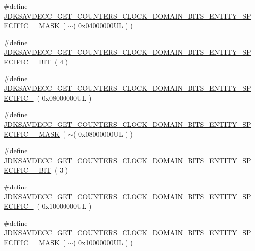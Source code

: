 \begin{DoxyCompactItemize}
\item 
\#define \hyperlink{group__get__counters__clock__domain__bits_gafa296abf8e30f09d23590a6b93f32a8c}{J\+D\+K\+S\+A\+V\+D\+E\+C\+C\+\_\+\+G\+E\+T\+\_\+\+C\+O\+U\+N\+T\+E\+R\+S\+\_\+\+C\+L\+O\+C\+K\+\_\+\+D\+O\+M\+A\+I\+N\+\_\+\+B\+I\+T\+S\+\_\+\+E\+N\+T\+I\+T\+Y\+\_\+\+S\+P\+E\+C\+I\+F\+I\+C\+\_\+\_\+\+M\+A\+SK}~( $\sim$( 0x04000000\+U\+L ) )
\item 
\#define \hyperlink{group__get__counters__clock__domain__bits_ga35faf687df9f185c32b0334ebe42051d}{J\+D\+K\+S\+A\+V\+D\+E\+C\+C\+\_\+\+G\+E\+T\+\_\+\+C\+O\+U\+N\+T\+E\+R\+S\+\_\+\+C\+L\+O\+C\+K\+\_\+\+D\+O\+M\+A\+I\+N\+\_\+\+B\+I\+T\+S\+\_\+\+E\+N\+T\+I\+T\+Y\+\_\+\+S\+P\+E\+C\+I\+F\+I\+C\+\_\+\_\+\+B\+IT}~( 4 )
\item 
\#define \hyperlink{group__get__counters__clock__domain__bits_ga399bf7154006fcc1fde390a46274982b}{J\+D\+K\+S\+A\+V\+D\+E\+C\+C\+\_\+\+G\+E\+T\+\_\+\+C\+O\+U\+N\+T\+E\+R\+S\+\_\+\+C\+L\+O\+C\+K\+\_\+\+D\+O\+M\+A\+I\+N\+\_\+\+B\+I\+T\+S\+\_\+\+E\+N\+T\+I\+T\+Y\+\_\+\+S\+P\+E\+C\+I\+F\+I\+C\+\_}~( 0x08000000\+U\+L )
\item 
\#define \hyperlink{group__get__counters__clock__domain__bits_gaac84ed5a88138bfb85681dbcb292d7f9}{J\+D\+K\+S\+A\+V\+D\+E\+C\+C\+\_\+\+G\+E\+T\+\_\+\+C\+O\+U\+N\+T\+E\+R\+S\+\_\+\+C\+L\+O\+C\+K\+\_\+\+D\+O\+M\+A\+I\+N\+\_\+\+B\+I\+T\+S\+\_\+\+E\+N\+T\+I\+T\+Y\+\_\+\+S\+P\+E\+C\+I\+F\+I\+C\+\_\+\_\+\+M\+A\+SK}~( $\sim$( 0x08000000\+U\+L ) )
\item 
\#define \hyperlink{group__get__counters__clock__domain__bits_gab42f5a56bfa9c065e3abacb10777a738}{J\+D\+K\+S\+A\+V\+D\+E\+C\+C\+\_\+\+G\+E\+T\+\_\+\+C\+O\+U\+N\+T\+E\+R\+S\+\_\+\+C\+L\+O\+C\+K\+\_\+\+D\+O\+M\+A\+I\+N\+\_\+\+B\+I\+T\+S\+\_\+\+E\+N\+T\+I\+T\+Y\+\_\+\+S\+P\+E\+C\+I\+F\+I\+C\+\_\+\_\+\+B\+IT}~( 3 )
\item 
\#define \hyperlink{group__get__counters__clock__domain__bits_ga751b07154321113ab903ecb807725ead}{J\+D\+K\+S\+A\+V\+D\+E\+C\+C\+\_\+\+G\+E\+T\+\_\+\+C\+O\+U\+N\+T\+E\+R\+S\+\_\+\+C\+L\+O\+C\+K\+\_\+\+D\+O\+M\+A\+I\+N\+\_\+\+B\+I\+T\+S\+\_\+\+E\+N\+T\+I\+T\+Y\+\_\+\+S\+P\+E\+C\+I\+F\+I\+C\+\_}~( 0x10000000\+U\+L )
\item 
\#define \hyperlink{group__get__counters__clock__domain__bits_ga6fc15f282e185e438b17b738b80fa880}{J\+D\+K\+S\+A\+V\+D\+E\+C\+C\+\_\+\+G\+E\+T\+\_\+\+C\+O\+U\+N\+T\+E\+R\+S\+\_\+\+C\+L\+O\+C\+K\+\_\+\+D\+O\+M\+A\+I\+N\+\_\+\+B\+I\+T\+S\+\_\+\+E\+N\+T\+I\+T\+Y\+\_\+\+S\+P\+E\+C\+I\+F\+I\+C\+\_\+\_\+\+M\+A\+SK}~( $\sim$( 0x10000000\+U\+L ) )

\end{DoxyCompactItemize}
